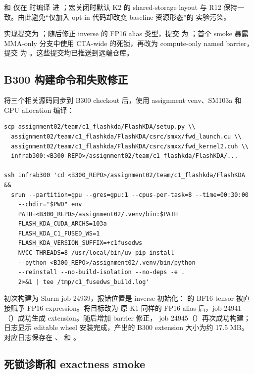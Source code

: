  和  仅在  时编译
进 ；宏关闭时默认 K2 的 shared-storage layout 与
R12 保持一致。由此避免“仅加入 opt-in 代码却改变 baseline 资源形态”的
实验污染。

实现提交为 ；随后修正 inverse 的 FP16 alias 类型，提交
为 ；首个 smoke 暴露 MMA-only 分支中使用 CTA-wide
 的死锁，再改为 compute-only named barrier，提交
为 。这些提交均已推送到远端仓库。

\subsection{B300 构建命令和失败修正}

将三个相关源码同步到 B300 checkout 后，使用 assignment venv、SM103a
和 GPU allocation 编译：

\begin{lstlisting}
scp assignment02/team/c1_flashkda/FlashKDA/setup.py \\
  assignment02/team/c1_flashkda/FlashKDA/csrc/smxx/fwd_launch.cu \\
  assignment02/team/c1_flashkda/FlashKDA/csrc/smxx/fwd_kernel2.cuh \\
  infrab300:<B300_REPO>/assignment02/team/c1_flashkda/FlashKDA/...

ssh infrab300 'cd <B300_REPO>/assignment02/team/c1_flashkda/FlashKDA &&
  srun --partition=gpu --gres=gpu:1 --cpus-per-task=8 --time=00:30:00
    --chdir="$PWD" env
    PATH=<B300_REPO>/assignment02/.venv/bin:$PATH
    FLASH_KDA_CUDA_ARCHS=103a
    FLASH_KDA_C1_FUSED_WS=1
    FLASH_KDA_VERSION_SUFFIX=+c1fusedws
    NVCC_THREADS=8 /usr/local/bin/uv pip install
    --python <B300_REPO>/assignment02/.venv/bin/python
    --reinstall --no-build-isolation --no-deps -e .
    2>&1 | tee /tmp/c1_fusedws_build.log'
\end{lstlisting}

初次构建为 Slurm job 24939，报错位置是 inverse 初始化：
 的 BF16 tensor 被直接赋予 FP16 expression。将目标改为
原 K1 同样的 FP16 alias  后，job 24941
（）成功生成 extension。随后增加 barrier 修正，
job 24945（）再次成功构建；日志显示 editable wheel
安装完成，产出的 B300 extension 大小为约 17.5 MB。对应日志保存在
、
 和
。

\subsection{死锁诊断和 exactness smoke}

